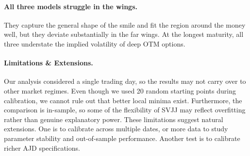\paragraph{All three models struggle in the wings.}
They capture the general shape of the smile and fit the region around the money well, but they
deviate substantially in the far wings. At the longest maturity, all three understate the implied
volatility of deep OTM options.

\paragraph{Limitations \&  Extensions.}
Our analysis considered a single trading day, so the results may not carry over to other market
regimes. Even though we used 20 random starting points during calibration, we cannot rule out that
better local minima exist. Furthermore, the comparison is in-sample, so some of the flexibility of
SVJJ may reflect overfitting rather than genuine explanatory power. These limitations suggest
natural extensions. One is to calibrate across multiple dates, or more data to study parameter
stability and out-of-sample performance. Another test is to calibrate richer AJD specifications.
